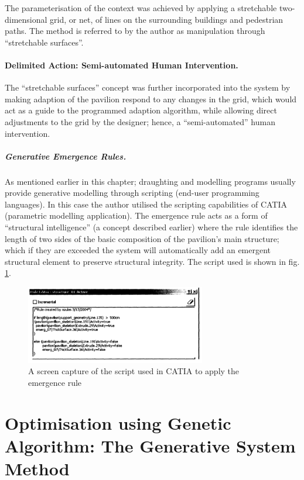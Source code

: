 The parameterisation of the context was achieved by applying a stretchable two-dimensional grid, or net, of lines on the surrounding buildings and pedestrian paths. The method is referred to by the author as manipulation through ``stretchable surfaces''.

\paragraph{Delimited Action: Semi-automated Human Intervention.}\mbox{}
The ``stretchable surfaces'' concept was further incorporated into the system by making adaption of the pavilion respond to any changes in the grid, which would act as a guide to the programmed adaption algorithm, while allowing direct adjustments to the grid by the designer; hence, a ``semi-automated'' human intervention.

\subparagraph{Generative Emergence Rules.} As mentioned earlier in this chapter; draughting and modelling programs usually provide generative modelling through scripting (end-user programming languages). In this case the author \cite{zulas04} utilised the scripting capabilities of CATIA (parametric modelling application). The emergence rule acts as a form of ``structural intelligence'' (a concept described earlier) where the rule identifies the length of two sides of the basic composition of the pavilion's main structure; which if they are exceeded the system will automatically add an emergent structural element to preserve structural integrity. The script used is shown in fig. \ref{fig:EmergRuleScr}.

\begin{figure}[htbp]
\centering
\includegraphics[width=0.7\textwidth]{./Images/14-EmergRuleScr}
\caption[Emergence Rule Script]{A screen capture of the script used in CATIA to apply the emergence rule \cite{zulas04}}
\label{fig:EmergRuleScr}
\end{figure}

\clearpage
\section{Optimisation using Genetic Algorithm: The Generative System Method}
\label{sec:GSM}

